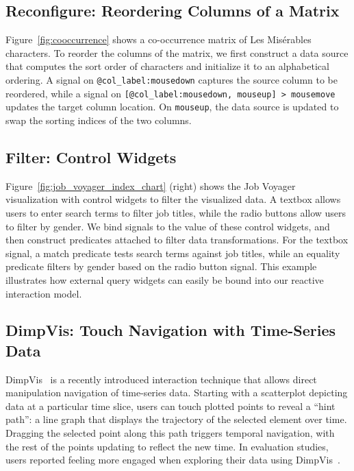 \subsection{Reconfigure: Reordering Columns of a Matrix}

Figure~\ref{fig:cooccurrence} shows a co-occurrence matrix of Les Mis\'{e}rables
characters. To reorder the columns of the matrix, we first construct a data
source that computes the sort order of characters and initialize it to an
alphabetical ordering. A signal on \texttt{@col\_label:mousedown} captures the
source column to be reordered, while a signal on \texttt{[@col\_label:mousedown,
mouseup] > mousemove} updates the target column location. On \texttt{mouseup},
the data source is updated to swap the sorting indices of the two columns.

\subsection{Filter: Control Widgets}

Figure~\ref{fig:job_voyager_index_chart} (right) shows the Job
Voyager~\cite{heer:voyagers} visualization with control widgets to filter the
visualized data. A textbox allows users to enter search terms to filter job
titles, while the radio buttons allow users to filter by gender. We bind signals
to the value of these control widgets, and then construct predicates attached to
filter data transformations. For the textbox signal, a match predicate tests
search terms against job titles, while an equality predicate filters by gender
based on the radio button signal. This example illustrates how external query
widgets can easily be bound into our reactive interaction model.

\subsection{DimpVis: Touch Navigation with Time-Series Data}

DimpVis~\cite{kondo:dimpvis} is a recently introduced interaction technique that
allows direct manipulation navigation of time-series data. Starting with a
scatterplot depicting data at a particular time slice, users can touch plotted
points to reveal a ``hint path'': a line graph that displays the trajectory of
the selected element over time. Dragging the selected point along this path
triggers temporal navigation, with the rest of the points updating to reflect
the new time. In evaluation studies, users reported feeling more engaged when
exploring their data using DimpVis~\cite{kondo:dimpvis}.

